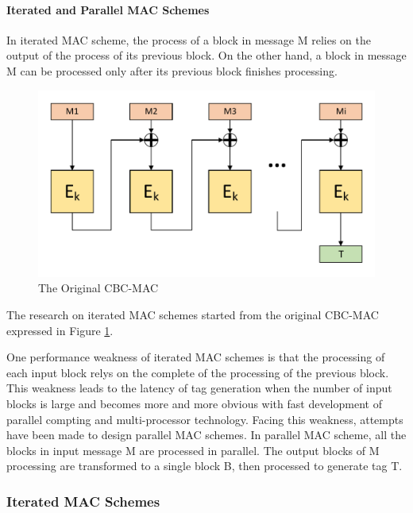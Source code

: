 \documentclass{article}
\begin{document}
\paragraph{Iterated and Parallel MAC Schemes}
In iterated MAC scheme, the process of a block in message M relies on the output of the process of its previous block. On the other hand, a block in message M can be processed only after its previous block finishes processing. 
\begin{figure}[htbp]
\centering
\includegraphics[scale=0.3]{./diagrams/cbc-mac.pdf}
\caption{The Original CBC-MAC}
\label{fig:CBC-mac}
\end{figure}
The research on iterated MAC schemes started from the original CBC-MAC expressed in Figure \ref{fig:CBC-mac}.

One performance weakness of iterated MAC schemes is that the processing of each input block relys on the complete of the processing of the previous block. This weakness leads to the latency of tag generation when the number of input blocks is large and becomes more and more obvious with fast development of parallel compting and multi-processor technology. 
Facing this weakness, attempts have been made to design parallel MAC schemes. 
In parallel MAC scheme, all the blocks in input message M are processed in parallel. The output blocks of M processing are transformed to a single block B, then processed to generate tag T. 

\subsubsection{Iterated MAC Schemes}
\end{document}
